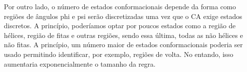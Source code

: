 Por outro lado, o número de estados conformacionais depende da forma como regiões de ângulos phi e psi serão discretizadas uma vez que o CA exige estados discretos. A princípio, poderíamos optar por poucos estados como a região de hélices, região de fitas e outras regiões, sendo essa última, todas as não hélices e não fitas. A princípio, um número maior de estados conformacionais poderia ser usado permitindo identificar, por exemplo, regiões de volta. No entando, isso aumentaria exponencialmente o tamanho da regra.





